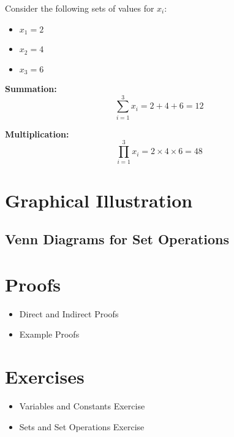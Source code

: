 \documentclass[
  11pt,
  letterpaper,
  DIV=11,
  numbers=noendperiod]{scrartcl}
\providecommand{\tightlist}{%
  \setlength{\itemsep}{0pt}\setlength{\parskip}{0pt}}\usepackage{longtable,booktabs,array}
\begin{document}
Consider the following sets of values for \(x_i\):

\begin{itemize}
\tightlist
\item
  \(x_1 = 2\)
\item
  \(x_2 = 4\)
\item
  \(x_3 = 6\)
\end{itemize}

\textbf{Summation:} \[ \sum_{i=1}^{3} x_i = 2 + 4 + 6 = 12 \]

\textbf{Multiplication:}
\[ \prod_{i=1}^{3} x_i = 2 \times 4 \times 6 = 48 \]

\section{Graphical Illustration}\label{graphical-illustration}

\subsection{Venn Diagrams for Set
Operations}\label{venn-diagrams-for-set-operations}



\section{Proofs}\label{proofs}

\begin{itemize}
\tightlist
\item
  Direct and Indirect Proofs
\end{itemize}

\begin{itemize}
\tightlist
\item
  Example Proofs
\end{itemize}

\section{Exercises}\label{exercises}

\begin{itemize}
\tightlist
\item
  Variables and Constants Exercise
\end{itemize}

\begin{itemize}
\tightlist
\item
  Sets and Set Operations Exercise
\end{itemize}
\end{document}

